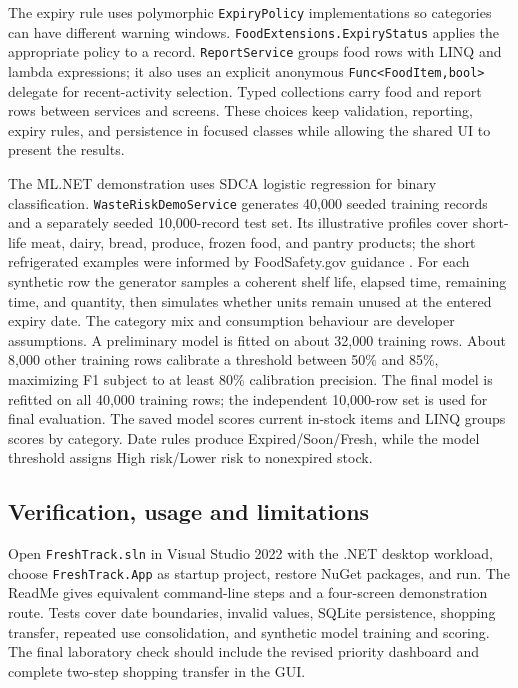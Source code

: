 \documentclass[11pt,a4paper]{article}
\begin{document}
The expiry rule uses polymorphic \texttt{ExpiryPolicy} implementations so categories can have different warning windows. \texttt{FoodExtensions.ExpiryStatus} applies the appropriate policy to a record. \texttt{ReportService} groups food rows with LINQ and lambda expressions; it also uses an explicit anonymous \texttt{Func<FoodItem,bool>} delegate for recent-activity selection. Typed collections carry food and report rows between services and screens. These choices keep validation, reporting, expiry rules, and persistence in focused classes while allowing the shared UI to present the results.

The ML.NET demonstration uses SDCA logistic regression for binary classification. \texttt{WasteRiskDemoService} generates 40,000 seeded training records and a separately seeded 10,000-record test set. Its illustrative profiles cover short-life meat, dairy, bread, produce, frozen food, and pantry products; the short refrigerated examples were informed by FoodSafety.gov guidance \cite{storage}. For each synthetic row the generator samples a coherent shelf life, elapsed time, remaining time, and quantity, then simulates whether units remain unused at the entered expiry date. The category mix and consumption behaviour are developer assumptions. A preliminary model is fitted on about 32,000 training rows. About 8,000 other training rows calibrate a threshold between 50\% and 85\%, maximizing F1 subject to at least 80\% calibration precision. The final model is refitted on all 40,000 training rows; the independent 10,000-row set is used for final evaluation. The saved model scores current in-stock items and LINQ groups scores by category. Date rules produce Expired/Soon/Fresh, while the model threshold assigns High risk/Lower risk to nonexpired stock.

\subsection*{Verification, usage and limitations}

Open \texttt{FreshTrack.sln} in Visual Studio 2022 with the .NET desktop workload, choose \texttt{FreshTrack.App} as startup project, restore NuGet packages, and run. The ReadMe gives equivalent command-line steps and a four-screen demonstration route. Tests cover date boundaries, invalid values, SQLite persistence, shopping transfer, repeated use consolidation, and synthetic model training and scoring. The final laboratory check should include the revised priority dashboard and complete two-step shopping transfer in the GUI.
\end{document}
